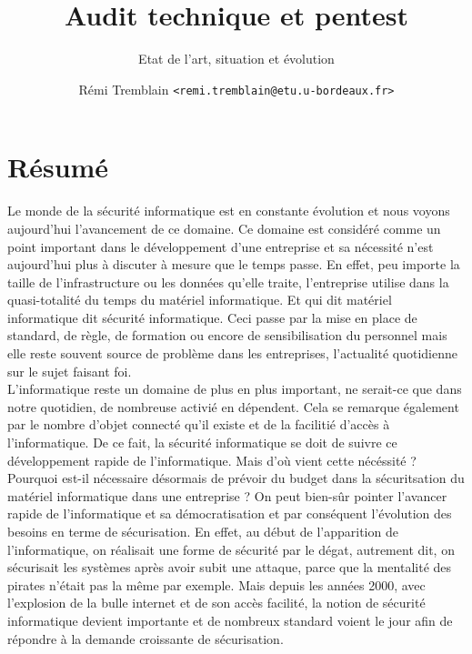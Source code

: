 \documentclass[a4paper]{memoir}
\title{Audit technique et pentest}
\subtitle{Etat de l'art, situation et évolution}
\author{Rémi Tremblain \texttt{<remi.tremblain@etu.u-bordeaux.fr>}}
\begin{document}
\frontmatter%
\maketitle
\thispagestyle{empty}





\chapter*{Résumé}


Le monde de la sécurité informatique est en constante évolution et nous voyons aujourd'hui l'avancement de ce domaine.
Ce domaine est considéré comme un point important dans le développement d'une entreprise et sa nécessité n'est aujourd'hui plus à discuter à mesure que le temps passe. En effet, peu importe la taille de l'infrastructure ou les données qu'elle traite, l'entreprise utilise dans la quasi-totalité du temps du matériel informatique. Et qui dit matériel informatique dit sécurité informatique. Ceci passe par la mise en place de standard, de règle, de formation ou encore de sensibilisation du personnel mais elle reste souvent source de problème dans les entreprises, l'actualité quotidienne sur le sujet faisant foi.\\

L'informatique reste un domaine de plus en plus important, ne serait-ce que dans notre quotidien, de nombreuse activié en dépendent. Cela se remarque également par le nombre d'objet connecté qu'il existe et de la facilitié d'accès à l'informatique. De ce fait, la sécurité informatique se doit de suivre ce développement rapide de l'informatique. Mais d'où vient cette nécéssité ? Pourquoi est-il nécessaire désormais de prévoir du budget dans la sécuritsation du matériel informatique dans une entreprise ? On peut bien-sûr pointer l'avancer rapide de l'informatique et sa démocratisation et par conséquent l'évolution des besoins en terme de sécurisation. En effet, au début de l'apparition de l'informatique, on réalisait une forme de sécurité par le dégat, autrement dit, on sécurisait les systèmes après avoir subit une attaque, parce que la mentalité des pirates n'était pas la même par exemple.
Mais depuis les années 2000, avec l'explosion de la bulle internet et de son accès facilité, la notion de sécurité informatique devient importante et de nombreux standard voient le jour afin de répondre à la demande croissante de sécurisation.
\end{document}
